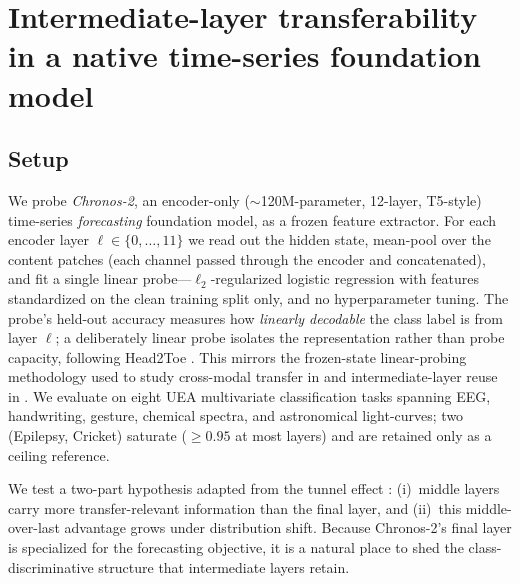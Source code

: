 
\section{Intermediate-layer transferability in a native time-series foundation model}
\label{sec:chronos-probing}

\subsection{Setup}
We probe \emph{Chronos-2}, an encoder-only ($\sim$120M-parameter, 12-layer, T5-style)
time-series \emph{forecasting} foundation model, as a frozen feature extractor. For each
encoder layer $\ell \in \{0,\dots,11\}$ we read out the hidden state, mean-pool over the
content patches (each channel passed through the encoder and concatenated), and fit a single
linear probe---$\ell_2$-regularized logistic regression with features standardized on the
clean training split only, and no hyperparameter tuning. The probe's held-out accuracy
measures how \emph{linearly decodable} the class label is from layer $\ell$; a deliberately
linear probe isolates the representation rather than probe capacity, following Head2Toe
\cite{evci2022head2toe}. This mirrors the frozen-state linear-probing methodology used to
study cross-modal transfer in \cite{roger2026manifold} and intermediate-layer reuse in
\cite{roschmann2025tivit}. We evaluate on eight UEA multivariate classification tasks
spanning EEG, handwriting, gesture, chemical spectra, and astronomical light-curves; two
(Epilepsy, Cricket) saturate ($\geq 0.95$ at most layers) and are retained only as a ceiling
reference.

We test a two-part hypothesis adapted from the tunnel effect \cite{masarczyk2023tunnel}:
(i)~middle layers carry more transfer-relevant information than the final layer, and
(ii)~this middle-over-last advantage grows under distribution shift. Because Chronos-2's
final layer is specialized for the forecasting objective, it is a natural place to shed the
class-discriminative structure that intermediate layers retain.

